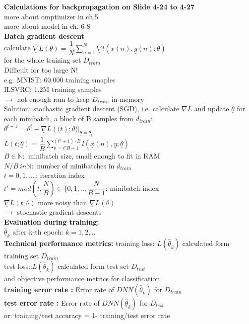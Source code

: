 \textbf{Calculations for backpropagation on Slide 4-24 to 4-27}\\
more about omptimizer in ch.5 \\
more about model in ch. 6-8 \\
\textbf{Batch gradient descent }\\
calculate $  \underline{\nabla} L (\underline{\theta}) = \dfrac{1}{N} \sum_{n=1}^{N} \underline{\nabla } l(\underline{x}(n) , \underline{y} (n); \underline{\theta}) $ \\
for the whole training set $ D_{train} $ \\
Difficult for too large N!\\
e.g. MNIST: 60.000 training smaples \\
ILSVRC: 1.2M training samples \\
$\rightarrow$ not enough ram to keep $ D_{train} $ in memory \\
Solution: stochastic gradient descent (SGD), i.e. calculate $ \underline{\nabla}L $ and update $ \underline{\theta} $ for each minibatch, a block of B samples from $ d_{train} $: \\
$ \underline{\theta}^{t+1} = \underline{\theta}^t - \underline{\nabla}L (\mathbf(t); \underline{\theta})|_{\underline{\theta} = \underline{\theta}_t} $\\
$ L(t; \underline{\theta}) =  \dfrac{1}{B} \sum_{n=t'B+1}^{(t' +1) \cdot B} l (\underline{x}(n), \underline{y} ; \underline{\theta})$ \\
$  B \in \mathds{N}: $ minibatch size, small enough to fit in RAM \\
$ N/B \ in \mathds{N}:  $ number of minibatches in $ d_{train} $ \\
$  t = 0,1 ,..,  $: iteration index \\
$  t' = mod(t, \dfrac{N}{B}) \in \lbrace 0,1,.., \dfrac{N}{B-1} $: minibatch index \\
$  \underline{\nabla } L (t; \underline{\theta}) $ more noisy than $\underline{\nabla} L (\underline{\theta} )$\\
$\rightarrow$ stochastic gradient descents \\
\textbf{Evaluation during training:} \\
$  \hat{ \underline{\theta}}_k  $ after k-th epoch: $  k = 1,2,.. $ \\
\textbf{Technical performance metrics:}
\textbullet training loss: $  L(\hat{\underline{\theta}}_k) $ calculated form training set $ D_{train} $\\
\textbullet test loss::$ L(\hat{\underline{\theta}}_k) $ calculated form test set $ D_{test} $\\
and objective performance metrics for classification \\
\textbullet \textbf{training error rate :} Error rate of $ DNN( \hat{\underline{\theta}}_k) $ for $ D_{train} $\\
\textbullet \textbf{test error rate :} Error rate of $ DNN( \hat{\underline{\theta}}_k) $ for $ D_{test} $\\
or:
\textbullet training/test accuracy =   1- training/test error rate \\






